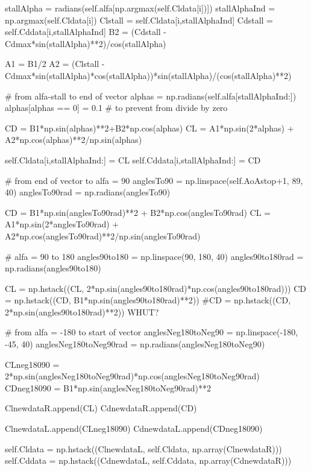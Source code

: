 \begin{pythoncode}
            stallAlpha = radians(self.alfa[np.argmax(self.Cldata[i])])   
            stallAlphaInd = np.argmax(self.Cldata[i])    
            Clstall = self.Cldata[i,stallAlphaInd]
            Cdstall = self.Cddata[i,stallAlphaInd]
            B2 = (Cdstall - Cdmax*sin(stallAlpha)**2)/cos(stallAlpha)

            A1 = B1/2
            A2 = (Clstall - Cdmax*sin(stallAlpha)*cos(stallAlpha))*sin(stallAlpha)/(cos(stallAlpha)**2)

            # from alfa-stall to end of vector
            alphas = np.radians(self.alfa[stallAlphaInd:])
            alphas[alphas == 0] = 0.1 # to prevent from divide by zero

            CD = B1*np.sin(alphas)**2+B2*np.cos(alphas)
            CL = A1*np.sin(2*alphas) + A2*np.cos(alphas)**2/np.sin(alphas)

            self.Cldata[i,stallAlphaInd:] = CL
            self.Cddata[i,stallAlphaInd:] = CD

            # from end of vector to alfa = 90
            anglesTo90 = np.linspace(self.AoAstop+1, 89, 40)
            anglesTo90rad = np.radians(anglesTo90)

            CD = B1*np.sin(anglesTo90rad)**2 + B2*np.cos(anglesTo90rad)
            CL = A1*np.sin(2*anglesTo90rad) + A2*np.cos(anglesTo90rad)**2/np.sin(anglesTo90rad)
            
            # alfa = 90 to 180
            angles90to180 = np.linspace(90, 180, 40)
            angles90to180rad = np.radians(angles90to180)

            CL = np.hstack((CL, 2*np.sin(angles90to180rad)*np.cos(angles90to180rad)))
            CD = np.hstack((CD, B1*np.sin(angles90to180rad)**2))
            #CD = np.hstack((CD, 2*np.sin(angles90to180rad)**2)) WHUT?
            
            # from alfa = -180 to start of vector 
            anglesNeg180toNeg90 = np.linspace(-180, -45, 40)
            anglesNeg180toNeg90rad = np.radians(anglesNeg180toNeg90)
            
            CLneg18090 = 2*np.sin(anglesNeg180toNeg90rad)*np.cos(anglesNeg180toNeg90rad)
            CDneg18090 = B1*np.sin(anglesNeg180toNeg90rad)**2
            
            ClnewdataR.append(CL)
            CdnewdataR.append(CD)

            ClnewdataL.append(CLneg18090)
            CdnewdataL.append(CDneg18090)

        self.Cldata = np.hstack((ClnewdataL, self.Cldata, np.array(ClnewdataR)))
        self.Cddata = np.hstack((CdnewdataL, self.Cddata, np.array(CdnewdataR)))


\end{pythoncode}
